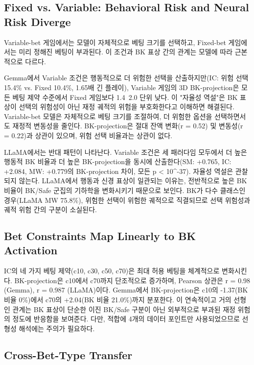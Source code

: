 \documentclass[11pt,a4paper]{article}
\begin{document}
\subsection{Fixed vs. Variable: Behavioral Risk and Neural Risk Diverge}

Variable-bet 게임에서는 모델이 자체적으로 베팅 크기를 선택하고, Fixed-bet 게임에서는 미리 정해진 베팅이 부과된다. 이 조건과 BK 표상 간의 관계는 모델에 따라 근본적으로 다르다.

Gemma에서 Variable 조건은 행동적으로 더 위험한 선택을 산출하지만(IC: 위험 선택 15.4\% vs. Fixed 10.4\%, 1.65배 긴 플레이), Variable 게임의 3D BK-projection은 모든 베팅 제약 수준에서 Fixed 게임보다 1.4~2.0 단위 낮다. 이 "자율성 역설"은 BK 표상이 선택의 위험성이 아닌 재정 궤적의 위험을 부호화한다고 이해하면 해결된다. Variable-bet 모델은 자체적으로 베팅 크기를 조절하여, 더 위험한 옵션을 선택하면서도 재정적 변동성을 줄인다. BK-projection은 절대 잔액 변화(r = 0.52) 및 변동성(r = 0.22)과 상관이 있으며, 위험 선택 비율과는 상관이 없다.

LLaMA에서는 반대 패턴이 나타난다. Variable 조건은 세 패러다임 모두에서 더 높은 행동적 BK 비율과 더 높은 BK-projection을 동시에 산출한다(SM: +0.765, IC: +2.084, MW: +0.779의 BK-projection 차이, 모든 p < 10^-37). 자율성 역설은 관찰되지 않는다. LLaMA에서 행동과 신경 표상이 일관되는 이유는, 전반적으로 높은 BK 비율이 BK/Safe 군집의 기하학을 변화시키기 때문으로 보인다. BK가 다수 클래스인 경우(LLaMA MW 75.8\%), 위험한 선택이 위험한 궤적으로 직결되므로 선택 위험성과 궤적 위험 간의 구분이 소실된다.

\subsection{Bet Constraints Map Linearly to BK Activation}

IC의 네 가지 베팅 제약(c10, c30, c50, c70)은 최대 허용 베팅을 체계적으로 변화시킨다. BK-projection은 c10에서 c70까지 단조적으로 증가하며, Pearson 상관은 r = 0.98 (Gemma), r = 0.987 (LLaMA)이다. Gemma에서 BK-projection은 c10의 -1.37(BK 비율 0\%)에서 c70의 +2.04(BK 비율 21.0\%)까지 분포한다. 이 연속적이고 거의 선형인 관계는 BK 표상이 단순한 이진 BK/Safe 구분이 아닌 외부적으로 부과된 재정 위험의 정도에 반응함을 보여준다. 다만, 적합에 4개의 데이터 포인트만 사용되었으므로 선형성 해석에는 주의가 필요하다.

\subsection{Cross-Bet-Type Transfer}
\end{document}
